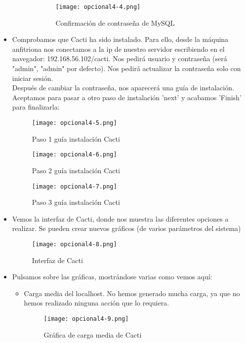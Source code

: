\begin{itemize}
\begin{itemize}
\begin{itemize}
				\begin{figure}[H] 
					\centering
					\texttt{[image: opcional4-4.png]} 
					\label{figura2} 			
					\caption{Confirmación de contraseña de MySQL}
				\end{figure}	 
			\end{itemize}
		\end{itemize}
		\item Comprobamos que Cacti ha sido instalado. Para ello, desde la máquina anfitriona nos conectamos a la ip de nuestro servidor escribiendo en el navegador: 192.168.56.102/cacti. Nos pedirá usuario y contraseña (será "admin", "admin" por defecto). Nos pedirá actualizar la contraseña solo con iniciar sesión.\\
		Después de cambiar la contraseña, nos aparecerá una guía de instalación. Aceptamos para pasar a otro paso de instalación 'next' y acabamos 'Finish' para finalizarla:
		\begin{figure}[H] 
			\centering
			\texttt{[image: opcional4-5.png]} 
			\label{figura2} 			
			\caption{Paso 1 guía instalación Cacti}
		\end{figure}
		\begin{figure}[H] 
			\centering
			\texttt{[image: opcional4-6.png]} 
			\label{figura2} 			
			\caption{Paso 2 guía instalación Cacti}
		\end{figure}
		\begin{figure}[H] 
			\centering
			\texttt{[image: opcional4-7.png]} 
			\label{figura2} 			
			\caption{Paso 3 guía instalación Cacti}
		\end{figure}
		\item Vemos la interfaz de Cacti, donde nos muestra las diferentes opciones a realizar. Se pueden crear nuevos gráficos (de varios parámetros del sistema)
		\begin{figure}[H] 
			\centering
			\texttt{[image: opcional4-8.png]} 
			\label{figura2} 			
			\caption{Interfaz de Cacti}
		\end{figure}
		\item Pulsamos sobre las gráficas, mostrándose varias como vemos aquí:
		\begin{itemize}
			\item Carga media del localhost. No hemos generado mucha carga, ya que no hemos realizado ninguna acción que lo requiera.
			\begin{figure}[H] 
				\centering
				\texttt{[image: opcional4-9.png]} 
				\label{figura2} 			
				\caption{Gráfica de carga media de Cacti}

\end{figure}
\end{itemize}
\end{itemize}
